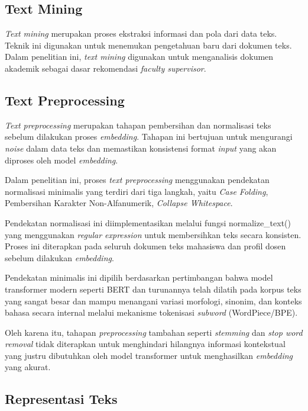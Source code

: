 \subsection{Text Mining}\label{text-mining}

\textit{Text mining} merupakan proses ekstraksi informasi dan pola dari data teks. Teknik ini digunakan untuk menemukan pengetahuan baru dari dokumen teks. Dalam penelitian ini, \textit{text mining} digunakan untuk menganalisis dokumen akademik sebagai dasar rekomendasi \textit{faculty supervisor}.

\subsection{Text Preprocessing}\label{text-preprocessing}

\textit{Text preprocessing} merupakan tahapan pembersihan dan normalisasi teks sebelum dilakukan proses \textit{embedding}. Tahapan ini bertujuan untuk mengurangi \textit{noise} dalam data teks dan memastikan konsistensi format \textit{input} yang akan diproses oleh model \textit{embedding}.

Dalam penelitian ini, proses \textit{text preprocessing} menggunakan pendekatan normalisasi minimalis yang terdiri dari tiga langkah, yaitu \textit{Case Folding}, Pembersihan Karakter Non-Alfanumerik, \textit{Collapse Whitespace}.

Pendekatan normalisasi ini diimplementasikan melalui fungsi normalize\_text() yang menggunakan \textit{regular expression} untuk membersihkan teks secara konsisten. Proses ini diterapkan pada seluruh dokumen teks mahasiswa dan profil dosen sebelum dilakukan \textit{embedding}.

Pendekatan minimalis ini dipilih berdasarkan pertimbangan bahwa model transformer modern seperti BERT dan turunannya telah dilatih pada korpus teks yang sangat besar dan mampu menangani variasi morfologi, sinonim, dan konteks bahasa secara internal melalui mekanisme tokenisasi \textit{subword} (WordPiece/BPE).

Oleh karena itu, tahapan \textit{preprocessing} tambahan seperti \textit{stemming} dan \textit{stop word removal} tidak diterapkan untuk menghindari hilangnya informasi kontekstual yang justru dibutuhkan oleh model transformer untuk menghasilkan \textit{embedding} yang akurat.

\subsection{Representasi Teks}\label{representasi-teks}

